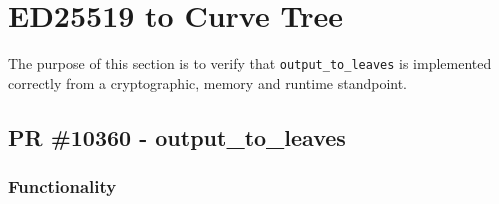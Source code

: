 \documentclass[12pt,titlepage,table]{article}
\begin{document}
\newpage
\section{ED25519 to Curve Tree}
The purpose of this section is to verify that \verb+output_to_leaves+ is implemented correctly from a cryptographic, memory and runtime standpoint.

\subsection{PR \#10360 - output\_to\_leaves}
\subsubsection{Functionality}

\end{document}
